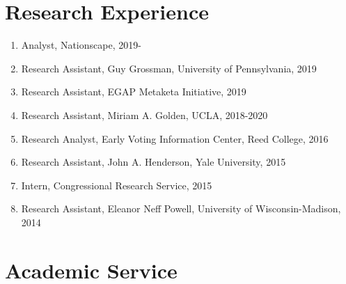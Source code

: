 \documentclass[12pt]{article}
\begin{document}
\section*{Research Experience}
 
\begin{enumerate}[topsep = 0pt, itemsep = 1ex, partopsep  = 1ex, parsep = 1ex]

	\item[] Analyst, Nationscape, 2019-

	\item[] Research Assistant, Guy Grossman, University of Pennsylvania, 2019
	
	\item[] Research Assistant, EGAP Metaketa Initiative, 2019
	
	\item[] Research Assistant, Miriam A. Golden, UCLA, 2018-2020
	
	\item[] Research Analyst, Early Voting Information Center, Reed College, 2016
	
	\item[] Research Assistant, John A. Henderson, Yale University, 2015
	
	\item[] Intern, Congressional Research Service, 2015
	
	\item[] Research Assistant, Eleanor Neff Powell, University of Wisconsin-Madison, 2014
	
\end{enumerate}

\section*{Academic Service} 
\end{document}
